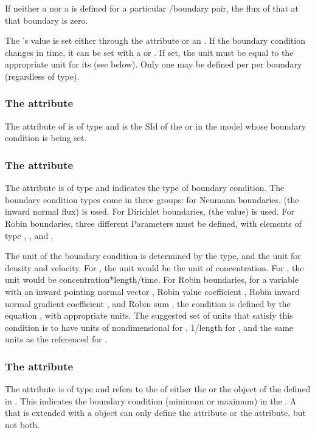 If neither a \BoundaryCondition nor a \Reaction is defined for a particular \Species/boundary pair, the flux of that \Species at that boundary is zero.

The \Parameter's value is set either through the  attribute or an \InitialAssignment.  If the boundary condition changes in time, it can be set with a \Rule or \Event.  If set, the \Parameter unit must be equal to the appropriate unit for its  (see below).  Only one \BoundaryCondition may be defined per \Species per boundary (regardless of type).


\subsubsection{The \fixttspace{} attribute}
The  attribute of \BoundaryCondition is of type  and is the SId of the \Species or \Parameter in the model whose boundary condition is being set.

\subsubsection{The \fixttspace{} attribute}
The  attribute is of type  and indicates the type of boundary condition. The boundary condition types come in three groups: for Neumann boundaries,  (the inward normal flux) is used.  For Dirichlet boundaries,  (the value) is used.  For Robin boundaries, three different Parameters must be defined, with \BoundaryCondition elements of type , , and .

The unit of the boundary condition is determined by the type, and the unit for density and velocity.  For , the unit would be the unit of concentration.  For , the unit would be concentration*length/time.  For Robin boundaries, for a variable  with an inward pointing normal vector , Robin value coefficient , Robin inward normal gradient coefficient , and Robin sum , the condition is defined by the equation , with appropriate units.  The suggested set of units that satisfy this condition is to have units of nondimensional for , 1/length for , and the same units as the referenced  for .

\subsubsection{The \fixttspace{} attribute}
The  attribute is of type  and refers to the  of either the  or the  object of the \CoordinateComponent defined in \Geometry. This  indicates the boundary condition (minimum or maximum) in the \CoordinateComponent. A \Parameter that is extended with a \BoundaryCondition object can only define the  attribute or the  attribute, but not both.

